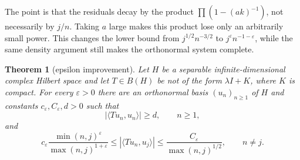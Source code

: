 \documentclass[11pt]{amsart}
\newtheorem{theorem}{Theorem}
\begin{document}
The point is that the residuals decay by the product
\(\prod(1-(ak)^{-1})\), not necessarily by \(j/n\).  Taking \(a\) large makes
this product lose only an arbitrarily small power.  This changes the lower
bound from \(j^{1/2}n^{-3/2}\) to \(j^\varepsilon n^{-1-\varepsilon}\), while
the same density argument still makes the orthonormal system complete.

\begin{theorem}[epsilon improvement]\label{thm:epsilon}
Let \(H\) be a separable infinite-dimensional complex Hilbert space and let
\(T\in B(H)\) be not of the form \(\lambda I+K\), where \(K\) is compact.
For every \(\varepsilon>0\) there are an orthonormal basis
\((u_n)_{n\ge1}\) of \(H\) and constants \(c_\varepsilon,C_\varepsilon,d>0\)
such that
\[
  |\langle Tu_n,u_n\rangle|\ge d,\qquad n\ge1,
\]
and
\[
  c_\varepsilon
  \frac{\min(n,j)^\varepsilon}{\max(n,j)^{1+\varepsilon}}
  \le |\langle Tu_n,u_j\rangle|
  \le \frac{C_\varepsilon}{\max(n,j)^{1/2}},
  \qquad n\ne j .
\]
\end{theorem}
\end{document}
